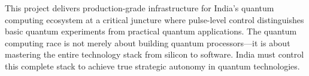\documentclass[12pt,a4paper]{article}
\begin{document}
This project delivers production-grade infrastructure for India's quantum computing ecosystem at a critical juncture where pulse-level control distinguishes basic quantum experiments from practical quantum applications. The quantum computing race is not merely about building quantum processors—it is about mastering the entire technology stack from silicon to software. India must control this complete stack to achieve true strategic autonomy in quantum technologies.
\end{document}
